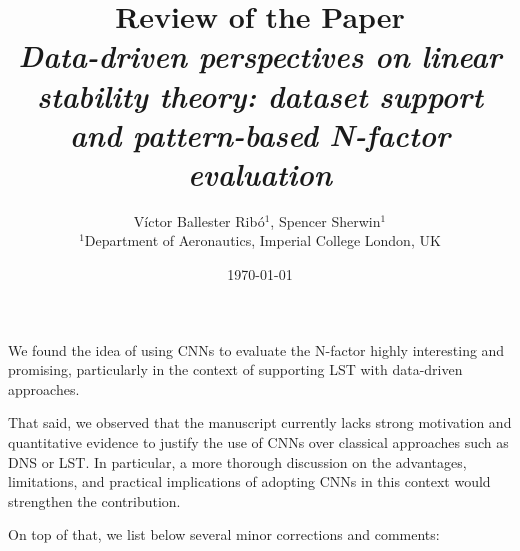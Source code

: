 \documentclass[11pt]{article}
\title{Review of the Paper\\\textit{Data-driven perspectives on linear stability theory: dataset support and pattern-based N-factor evaluation}}
\author{Víctor Ballester Ribó$^1$, Spencer Sherwin$^1$\\
 \small $^1$Department of Aeronautics, Imperial College London, UK}
\date{\today}
\begin{document}
\maketitle

We found the idea of using CNNs to evaluate the N-factor highly interesting and promising, particularly in the context of supporting LST with data-driven approaches. 

That said, we observed that the manuscript currently lacks strong motivation and quantitative evidence to justify the use of CNNs over classical approaches such as DNS or LST. In particular, a more thorough discussion on the advantages, limitations, and practical implications of adopting CNNs in this context would strengthen the contribution.

On top of that, we list below several minor corrections and comments:
\end{document}
